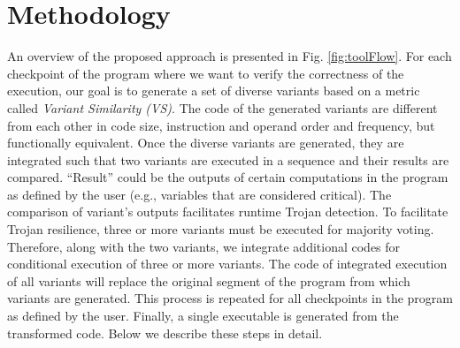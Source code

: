 \documentclass[conference]{IEEEtran}
\begin{document}
\section{Methodology}
\label{sec:method}
An overview of the proposed approach is presented in Fig. \ref{fig:toolFlow}. For each checkpoint of the program where we want to verify the correctness of the execution, our goal is to generate a set of diverse variants based on a metric  called \textit{Variant Similarity (VS)}. The code of the generated variants are different from each other in code size, instruction and operand order and frequency, but functionally equivalent. %
Once the diverse variants are generated, they are integrated such that two variants are executed in a sequence and their results are compared. ``Result'' could be the outputs of certain computations in the  program as defined by the user (e.g., variables that are considered critical). The comparison of variant's outputs facilitates runtime Trojan detection. To facilitate Trojan resilience, three or more variants must be executed for majority voting. Therefore, along with the two variants, we integrate additional codes for conditional execution of three or more variants. The code of integrated execution of all variants will replace the original segment of the program from which variants are generated. This process is repeated for all checkpoints in the program as defined by the user. Finally, a single executable is generated from the transformed code. 
Below we describe these steps in detail.%
\end{document}
